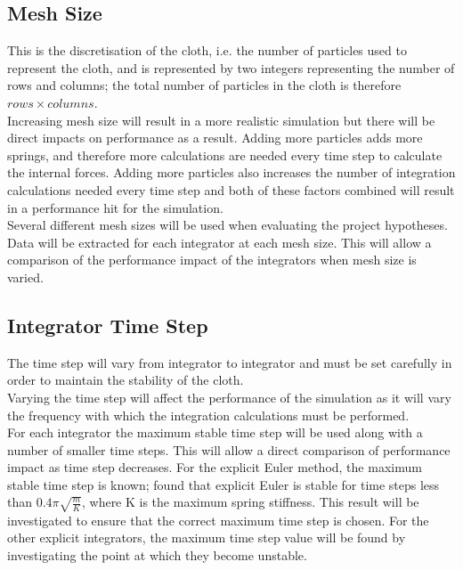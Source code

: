 \subsection{Mesh Size}
This is the discretisation of the cloth, i.e. the number of particles used to represent the cloth, and is represented by two integers representing the number of rows and columns; the total number of particles in the cloth is therefore $rows \times columns$.
\\Increasing mesh size will result in a more realistic simulation but there will be direct impacts on performance as a result. Adding more particles adds more springs, and therefore more calculations are needed every time step to calculate the internal forces. Adding more particles also increases the number of integration calculations needed every time step and both of these factors combined will result in a performance hit for the simulation.
\\Several different mesh sizes will be used when evaluating the project hypotheses. Data will be extracted for each integrator at each mesh size. This will allow a comparison of the performance impact of the integrators when mesh size is varied.

\subsection{Integrator Time Step}
The time step will vary from integrator to integrator and must be set carefully in order to maintain the stability of the cloth.
\\Varying the time step will affect the performance of the simulation as it will vary the frequency with which the integration calculations must be performed.
\\For each integrator the maximum stable time step will be used along with a number of smaller time steps. This will allow a direct comparison of performance impact as time step decreases. For the explicit Euler method, the maximum stable time step is known; \textcite[2]{Vassilev2001} found that explicit Euler is stable for time steps less than $0.4\pi\sqrt{\frac{m}{K}}$, where K is the maximum spring stiffness. This result will be investigated to ensure that the correct maximum time step is chosen. For the other explicit integrators, the maximum time step value will be found by investigating the point at which they become unstable.

